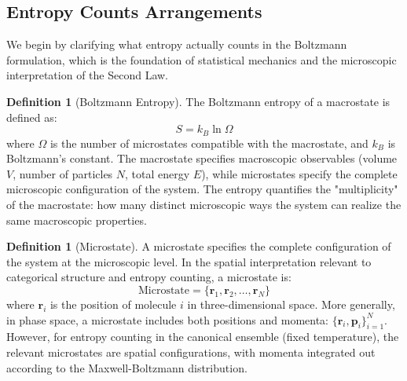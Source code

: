 \documentclass[12pt,a4paper]{article}
\theoremstyle{definition}
\newtheorem{definition}[theorem]{Definition}
\theoremstyle{remark}
\begin{document}
\subsection{Entropy Counts Arrangements}

We begin by clarifying what entropy actually counts in the Boltzmann formulation, which is the foundation of statistical mechanics and the microscopic interpretation of the Second Law.

\begin{definition}[Boltzmann Entropy]
\label{def:boltzmann_entropy}
The Boltzmann entropy of a macrostate is defined as:
\begin{equation}
S = k_B \ln \Omega
\label{eq:boltzmann_entropy}
\end{equation}
where $\Omega$ is the number of microstates compatible with the macrostate, and $k_B$ is Boltzmann's constant. The macrostate specifies macroscopic observables (volume $V$, number of particles $N$, total energy $E$), while microstates specify the complete microscopic configuration of the system. The entropy quantifies the "multiplicity" of the macrostate: how many distinct microscopic ways the system can realize the same macroscopic properties.
\end{definition}

\begin{definition}[Microstate]
\label{def:microstate}
A microstate specifies the complete configuration of the system at the microscopic level. In the spatial interpretation relevant to categorical structure and entropy counting, a microstate is:
\begin{equation}
\text{Microstate} = \{\mathbf{r}_1, \mathbf{r}_2, \ldots, \mathbf{r}_N\}
\label{eq:microstate_spatial}
\end{equation}
where $\mathbf{r}_i$ is the position of molecule $i$ in three-dimensional space. More generally, in phase space, a microstate includes both positions and momenta: $\{\mathbf{r}_i, \mathbf{p}_i\}_{i=1}^N$. However, for entropy counting in the canonical ensemble (fixed temperature), the relevant microstates are spatial configurations, with momenta integrated out according to the Maxwell-Boltzmann distribution.
\end{definition}
\end{document}
